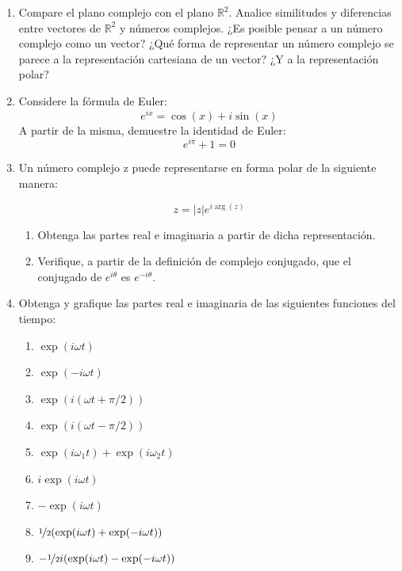 \documentclass[11pt,spanish]{article}
\begin{document}
\begin{enumerate}

    \item Compare el plano complejo con el plano $\mathbb{R}^2$. Analice similitudes y diferencias entre vectores de $\mathbb{R}^2$ y números complejos. ¿Es posible pensar a un número complejo como un vector? ¿Qué forma de representar un número complejo se parece a la representación cartesiana de un vector? ¿Y a la representación polar?


    \item Considere la fórmula de Euler:
    $$e^{ix} = \cos(x) + i \sin(x)$$
    A partir de la misma, demuestre la identidad de Euler:
    $$e^{i\pi} + 1 = 0$$
    

    \item Un número complejo z puede representarse en forma polar de la siguiente manera:

    $$z = |z|e^{i \arg(z)}$$

    \begin{enumerate}
        \item Obtenga las partes real e imaginaria a partir de dicha representación.
        
        \item Verifique, a partir de la definición de complejo conjugado, que el conjugado de $e^{i \theta}$ es $e^{-i \theta}$.
    \end{enumerate}
    


    \item Obtenga y grafique las partes real e imaginaria de las siguientes funciones del tiempo:

    \begin{enumerate}
        \item $\exp(i \omega t)$
        \item $\exp(-i \omega t)$
        \item $\exp(i (\omega t + \pi/2))$
        \item $\exp(i (\omega t - \pi/2))$
        \item $\exp(i \omega_1 t) + \exp(i \omega_2 t) $
        \item $i \exp(i \omega t)$
        \item $-\exp(i \omega t)$
        \item $\nicefrac{1}{2} (\exp(i \omega t) + \exp(-i \omega t))$
        \item $- \nicefrac{1}{2} i(\exp(i \omega t) - \exp(-i \omega t))$
    \end{enumerate}


\end{enumerate}
\end{document}

